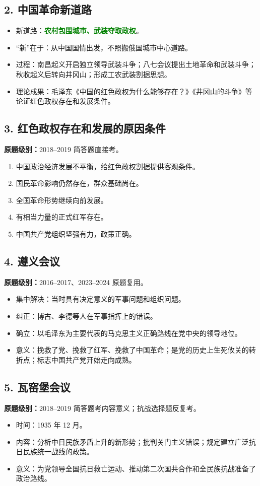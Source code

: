 \documentclass[UTF8,zihao=-4]{ctexart}
\newcommand{\exam}[1]{\textcolor{accent}{\bfseries 原题级别：}#1}
\newcommand{\core}[1]{\textcolor{green}{\bfseries #1}}
\begin{document}
\subsection{2. 中国革命新道路}
\begin{itemize}
  \item 新道路：\core{农村包围城市、武装夺取政权}。
  \item “新”在于：从中国国情出发，不照搬俄国城市中心道路。
  \item 过程：南昌起义开启独立领导武装斗争；八七会议提出土地革命和武装斗争；秋收起义后转向井冈山；形成工农武装割据思想。
  \item 理论成果：毛泽东《中国的红色政权为什么能够存在？》《井冈山的斗争》等论证红色政权存在和发展条件。
\end{itemize}

\subsection{3. 红色政权存在和发展的原因条件}
\exam{2018--2019 简答题直接考。}
\begin{enumerate}
  \item 中国政治经济发展不平衡，给红色政权割据提供客观条件。
  \item 国民革命影响仍然存在，群众基础尚在。
  \item 全国革命形势继续向前发展。
  \item 有相当力量的正式红军存在。
  \item 中国共产党组织坚强有力，政策正确。
\end{enumerate}

\subsection{4. 遵义会议}
\exam{2016--2017、2023--2024 原题复用。}
\begin{itemize}
  \item 集中解决：当时具有决定意义的军事问题和组织问题。
  \item 纠正：博古、李德等人在军事指挥上的错误。
  \item 确立：以毛泽东为主要代表的马克思主义正确路线在党中央的领导地位。
  \item 意义：挽救了党、挽救了红军、挽救了中国革命；是党的历史上生死攸关的转折点；标志中国共产党开始走向成熟。
\end{itemize}

\subsection{5. 瓦窑堡会议}
\exam{2018--2019 简答题考内容意义；抗战选择题反复考。}
\begin{itemize}
  \item 时间：1935 年 12 月。
  \item 内容：分析中日民族矛盾上升的新形势；批判关门主义错误；规定建立广泛抗日民族统一战线的政策。
  \item 意义：为党领导全国抗日救亡运动、推动第二次国共合作和全民族抗战准备了政治路线。
\end{itemize}
\end{document}
